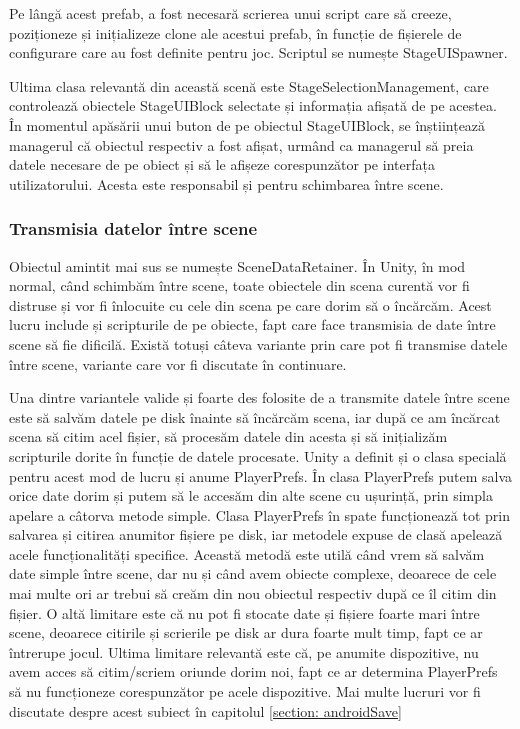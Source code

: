 \documentclass[12pt, a4paper]{article}
\begin{document}
	Pe lângă acest prefab, a fost necesară scrierea unui script care să creeze, poziționeze și inițializeze clone ale acestui prefab, în funcție de fișierele de configurare care au fost definite pentru joc. Scriptul se numește StageUISpawner.
	\newline
	
	Ultima clasa relevantă din această scenă este StageSelectionManagement, care controlează obiectele StageUIBlock selectate și informația afișată de pe acestea. În momentul apăsării unui buton de pe obiectul StageUIBlock, se înștiințează managerul că obiectul respectiv a fost afișat, urmând ca managerul să preia datele necesare de pe obiect și să le afișeze corespunzător pe interfața utilizatorului. Acesta este responsabil și pentru schimbarea între scene.
	
	
	
	
	
	\subsubsection{Transmisia datelor între scene}
	\label{section: dataBetweenScenes}
	
	Obiectul amintit mai sus se numește SceneDataRetainer. În Unity, în mod normal, când schimbăm între scene, toate obiectele din scena curentă vor fi distruse și vor fi înlocuite cu cele din scena pe care dorim să o încărcăm. Acest lucru include și scripturile de pe obiecte, fapt care face transmisia de date între scene să fie dificilă. Există totuși câteva variante prin care pot fi transmise datele între scene, variante care vor fi discutate în continuare.
	\newline
	
	Una dintre variantele valide și foarte des folosite de a transmite datele între scene este să salvăm datele pe disk înainte să încărcăm scena, iar după ce am încărcat scena să citim acel fișier, să procesăm datele din acesta și să inițializăm scripturile dorite în funcție de datele procesate. Unity a definit și o clasa specială pentru acest mod de lucru și anume PlayerPrefs. În clasa PlayerPrefs putem salva orice date dorim și putem să le accesăm din alte scene cu ușurință, prin simpla apelare a câtorva metode simple. Clasa PlayerPrefs în spate funcționează tot prin salvarea și citirea anumitor fișiere pe disk, iar metodele expuse de clasă apelează acele funcționalități specifice. Această metodă este utilă când vrem să salvăm date simple între scene, dar nu și când avem obiecte complexe, deoarece de cele mai multe ori ar trebui să creăm din nou obiectul respectiv după ce îl citim din fișier. O altă limitare este că nu pot fi stocate date și fișiere foarte mari între scene, deoarece citirile și scrierile pe disk ar dura foarte mult timp, fapt ce ar întrerupe jocul. Ultima limitare relevantă este că, pe anumite dispozitive, nu avem acces să citim/scriem oriunde dorim noi, fapt ce ar determina PlayerPrefs să nu funcționeze corespunzător pe acele dispozitive. Mai multe lucruri vor fi discutate despre acest subiect în capitolul \ref{section: androidSave}
	\newline
	
\end{document}

